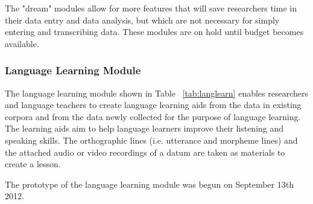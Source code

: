 \documentclass[12pt]{article}
\begin{document}
The "dream" modules allow for more features that will save researchers time in their data entry and data analysis, but which are not necessary for simply entering and transcribing data. These modules are on hold until budget becomes available.


\subsubsection{Language Learning Module}
The language learning module shown in Table ~\ref{tab:langlearn} enables researchers and language teachers to create language learning aids from the data in existing corpora and from the data newly collected for the purpose of language learning. The learning aids aim to help language learners improve their listening and speaking skills. The orthographic lines (i.e. utterance and morpheme lines) and the attached audio or video recordings of a datum are taken as materials to create a lesson. 


The prototype of the language learning module was begun on September 13th 2012.
\end{document}

